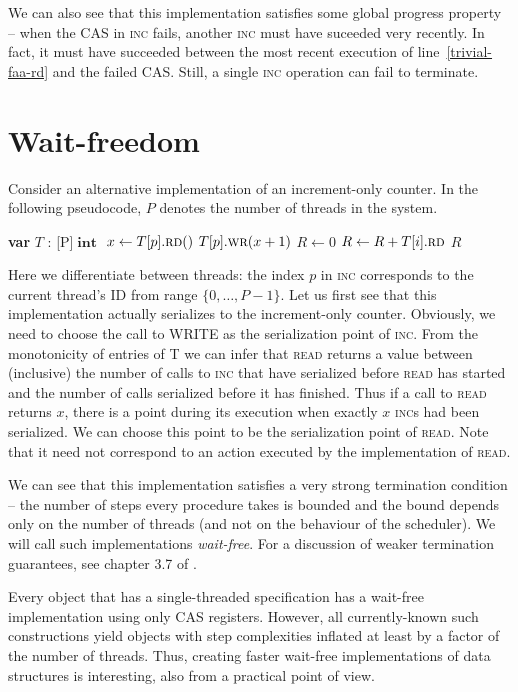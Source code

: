 \documentclass{thesis}
\def\int{\ensuremath{\operatorname{\textbf{int}}}}
\newcommand{\fn}[1]{\textsc{#1}}
\newcommand{\var}[2]{\textbf{var }#1 : #2}
\newcommand{\arrayspec}[1]{\text{array}[#1]\text{ of }}
\begin{document}
We can also see that this implementation satisfies some global progress property -- when the CAS in \fn{inc} fails,
another \fn{inc} must have suceeded very recently. In fact, it must have succeeded between the most recent execution
of line~\ref{trivial-faa-rd} and the failed CAS. Still, a single \fn{inc} operation can fail to terminate.

\section{Wait-freedom}

Consider an alternative implementation of an increment-only counter. In the following pseudocode, $P$ denotes
the number of threads in the system.

\begin{algorithmic}[1]
	\State\var{$T$}{\arrayspec{P}$\int$} \Comment{T is an array of $P$ CAS objects of type \int}
	\State $x \gets T[p].\fn{rd}()$
	\State $T[p].\fn{wr}(x + 1)$
\EndFunction
{}
	\State $R \gets 0$
	\State $R \gets R + T[i].\fn{rd}$
	\EndFor
	\State\Return $R$
\EndFunction
\end{algorithmic}

Here we differentiate between threads: the index $p$ in \fn{inc} corresponds to the current thread's ID from range
$\{0, \ldots, P-1\}$. Let us first see that this implementation actually serializes to the increment-only counter.
Obviously, we need to choose the call to WRITE as the serialization point of \fn{inc}. From the monotonicity
of entries of T we can infer that \fn{read} returns a value between (inclusive) the number of calls to \fn{inc} that have
serialized before \fn{read} has started and the number of calls serialized before it has finished.
Thus if a call to \fn{read} returns $x$, there is a point during its
execution when exactly $x$ \fn{inc}s had been serialized. We can choose this point to be the serialization point of
\fn{read}. Note that it need not correspond to an action executed by the implementation of \fn{read}.

We can see that this implementation satisfies a very strong termination condition -- the number of steps every
procedure takes is bounded and the bound depends only on the number of threads (and not on the behaviour of
the scheduler). We will call such implementations \emph{wait-free}. For a discussion of weaker
termination guarantees, see chapter 3.7 of \cite{TheArt}.

Every object that has a single-threaded specification has a wait-free implementation\cite{cas-univ} using
only CAS registers.
However, all currently-known such constructions yield objects with step complexities inflated at least by a factor
of the number of threads.
Thus, creating faster wait-free implementations of data structures is interesting, also from a practical
point of view.
\end{document}
